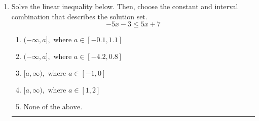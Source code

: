 \documentclass[14pt]{extbook}
\newcommand{\litem}[1]{\item#1\hspace*{-1cm}\rule{\textwidth}{0.4pt}}
\begin{document}
\begin{enumerate}
{\begin{enumerate}[label=\Alph*.]
\end{enumerate} }
\litem{
Solve the linear inequality below. Then, choose the constant and interval combination that describes the solution set.\[ -5x -3 \leq 5x + 7 \]\begin{enumerate}[label=\Alph*.]
\item \( (-\infty, a], \text{ where } a \in [-0.1, 1.1] \)
\item \( (-\infty, a], \text{ where } a \in [-4.2, 0.8] \)
\item \( [a, \infty), \text{ where } a \in [-1, 0] \)
\item \( [a, \infty), \text{ where } a \in [1, 2] \)
\item \( \text{None of the above}. \)

\end{enumerate} }
\end{enumerate}
\end{document}
